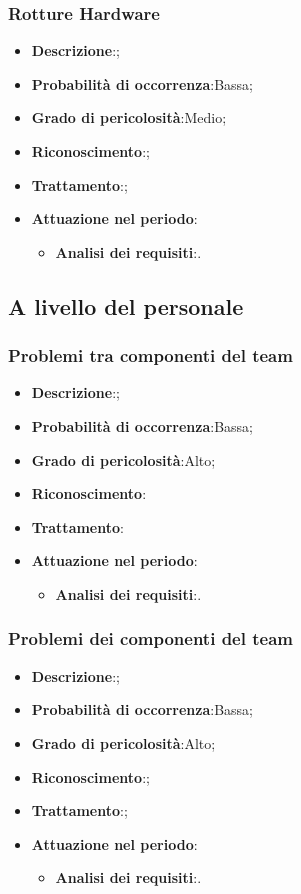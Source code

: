 		\subsubsection{Rotture Hardware}
		\begin{itemize}
			\item \textbf{Descrizione}:;
			\item \textbf{Probabilità di occorrenza}:Bassa;
			\item \textbf{Grado di pericolosità}:Medio;
			\item \textbf{Riconoscimento}:;	
			\item \textbf{Trattamento}:;
			\item \textbf{Attuazione nel periodo}:
			\begin{itemize}
				\item \textbf{Analisi dei requisiti}:.
			\end{itemize}
		\end{itemize}	
	
	\subsection{A livello del personale}
	
		\subsubsection{Problemi tra componenti del team}
		\begin{itemize}
			\item \textbf{Descrizione}:;
			\item \textbf{Probabilità di occorrenza}:Bassa;
			\item \textbf{Grado di pericolosità}:Alto;
			\item \textbf{Riconoscimento}:	
			\item \textbf{Trattamento}:
			\item \textbf{Attuazione nel periodo}:
			\begin{itemize}
				\item \textbf{Analisi dei requisiti}:.
			\end{itemize}
		\end{itemize}
		
		\subsubsection{Problemi dei componenti del team}
		\begin{itemize}
			\item \textbf{Descrizione}:;
			\item \textbf{Probabilità di occorrenza}:Bassa;
			\item \textbf{Grado di pericolosità}:Alto;
			\item \textbf{Riconoscimento}:;
			\item \textbf{Trattamento}:;
			\item \textbf{Attuazione nel periodo}:
			\begin{itemize}
				\item \textbf{Analisi dei requisiti}:.
			\end{itemize}
		\end{itemize}
		
